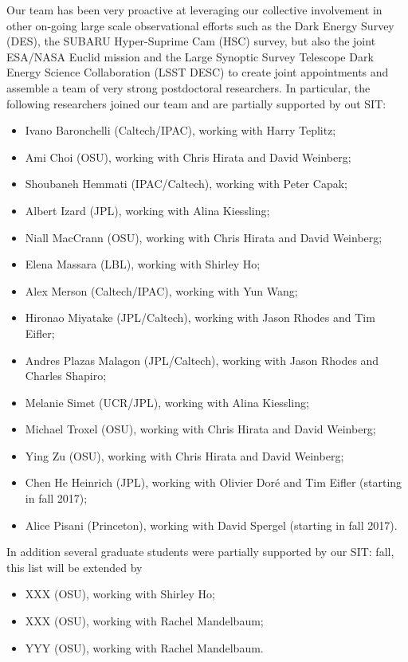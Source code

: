 Our team has been very proactive at leveraging our collective involvement in other on-going large scale observational efforts such as the Dark Energy Survey (DES), the SUBARU Hyper-Suprime Cam (HSC) survey, but also the joint ESA/NASA Euclid mission and the Large Synoptic Survey Telescope Dark Energy Science Collaboration (LSST DESC) to create joint appointments and assemble a team of very strong postdoctoral researchers. In particular, the following researchers joined our team and are partially supported by out SIT:
\begin{itemize}
\item Ivano Baronchelli (Caltech/IPAC), working with Harry Teplitz;
\item Ami Choi (OSU), working with Chris Hirata and David Weinberg;
\item Shoubaneh Hemmati (IPAC/Caltech), working with Peter Capak;
\item Albert Izard (JPL), working with Alina Kiessling;
\item Niall MacCrann (OSU), working with Chris Hirata and David Weinberg;
\item Elena Massara (LBL), working with Shirley Ho;
\item Alex Merson (Caltech/IPAC), working with Yun Wang;
\item Hironao Miyatake (JPL/Caltech), working with Jason Rhodes and Tim Eifler;
\item Andres Plazas Malagon (JPL/Caltech), working with Jason Rhodes and Charles Shapiro;
\item Melanie Simet (UCR/JPL), working with Alina Kiessling;
\item Michael Troxel (OSU), working with Chris Hirata and David Weinberg;
\item Ying Zu (OSU), working with Chris Hirata and David Weinberg;
\item Chen He Heinrich (JPL), working with Olivier Dor\'e and Tim Eifler (starting in fall 2017);
\item Alice Pisani (Princeton), working with David Spergel (starting in fall 2017).
\end{itemize}

In addition several graduate students were partially supported by our SIT: fall, this list will be extended by
\begin{itemize}
\item XXX (OSU), working with Shirley Ho;
\item XXX (OSU), working with Rachel Mandelbaum;
\item YYY (OSU), working with Rachel Mandelbaum.
\end{itemize}

